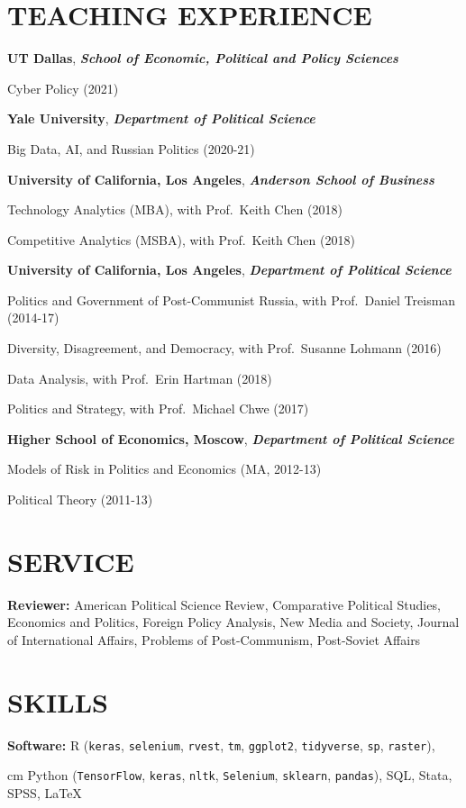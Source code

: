 \documentclass[11pt,]{article}
\begin{document}
\hypertarget{teaching-experience}{%
\section{TEACHING EXPERIENCE}\label{teaching-experience}}

\textbf{UT Dallas}, \textbf{\emph{School of Economic, Political and
Policy Sciences}}

\hskip 1cm Cyber Policy (2021)

\textbf{Yale University}, \textbf{\emph{Department of Political
Science}}

\hskip 1cm Big Data, AI, and Russian Politics (2020-21)

\textbf{University of California, Los Angeles}, \textbf{\emph{Anderson
School of Business}}

\hskip 1cm Technology Analytics (MBA), with Prof.~Keith Chen (2018)

\hskip 1cm Competitive Analytics (MSBA), with Prof.~Keith Chen (2018)

\textbf{University of California, Los Angeles}, \textbf{\emph{Department
of Political Science}}

\hskip 1cm Politics and Government of Post-Communist Russia, with
Prof.~Daniel Treisman (2014-17)

\hskip 1cm Diversity, Disagreement, and Democracy, with Prof.~Susanne
Lohmann (2016)

\hskip 1cm Data Analysis, with Prof.~Erin Hartman (2018)

\hskip 1cm Politics and Strategy, with Prof.~Michael Chwe (2017)

\textbf{Higher School of Economics, Moscow}, \textbf{\emph{Department of
Political Science}}

\hskip 1cm Models of Risk in Politics and Economics (MA, 2012-13)

\hskip 1cm Political Theory (2011-13)

\hypertarget{service}{%
\section{SERVICE}\label{service}}

\textbf{Reviewer:} American Political Science Review, Comparative
Political Studies, Economics and Politics, Foreign Policy Analysis, New
Media and Society, Journal of International Affairs, Problems of
Post-Communism, Post-Soviet Affairs

\hypertarget{skills}{%
\section{SKILLS}\label{skills}}

\textbf{Software:} R (\texttt{keras}, \texttt{selenium}, \texttt{rvest},
\texttt{tm}, \texttt{ggplot2}, \texttt{tidyverse}, \texttt{sp},
\texttt{raster}),

 cm Python (\texttt{TensorFlow}, \texttt{keras},
\texttt{nltk}, \texttt{Selenium}, \texttt{sklearn}, \texttt{pandas}),
SQL, Stata, SPSS, \LaTeX
\end{document}
